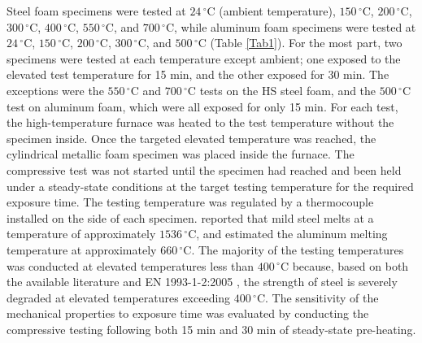 \documentclass[review]{elsarticle}
\begin{document}
Steel foam specimens were tested at $24\,^{\circ}\mathrm{C}$ (ambient temperature), $150\,^{\circ}\mathrm{C}$, $200\,^{\circ}\mathrm{C}$, $300\,^{\circ}\mathrm{C}$, $400\,^{\circ}\mathrm{C}$, $550\,^{\circ}\mathrm{C}$, and $700\,^{\circ}\mathrm{C}$, while aluminum foam specimens were tested at $24\,^{\circ}\mathrm{C}$, $150\,^{\circ}\mathrm{C}$, $200\,^{\circ}\mathrm{C}$, $300\,^{\circ}\mathrm{C}$, and $500\,^{\circ}\mathrm{C}$ (Table \ref{Tab1}). For the most part, two specimens were tested at each temperature except ambient; one exposed to the elevated test temperature for 15 min, and the other exposed for 30 min. The exceptions were the $550\,^{\circ}\mathrm{C}$ and $700\,^{\circ}\mathrm{C}$ tests on the HS steel foam, and the $500\,^{\circ}\mathrm{C}$ test on aluminum foam, which were all exposed for only 15 min. For each test, the high-temperature furnace was heated to the test temperature without the specimen inside. Once the targeted elevated temperature was reached, the cylindrical metallic foam specimen was placed inside the furnace. The compressive test was not started until the specimen had reached and been held under a steady-state conditions at the target testing temperature for the required exposure time. The testing temperature was regulated by a thermocouple installed on the side of each specimen. \cite{Avalloneetal2007} reported that mild steel melts at a temperature of approximately $1536\,^{\circ}\mathrm{C}$, and \cite{Ashsby2000} estimated the aluminum melting temperature at approximately $660\,^{\circ}\mathrm{C}$. The majority of the testing temperatures was conducted at elevated temperatures less than $400\,^{\circ}\mathrm{C}$  because, based on both the available literature and EN 1993-1-2:2005 \cite{EC3-1-2}, the strength of steel is severely degraded at elevated temperatures exceeding $400\,^{\circ}\mathrm{C}$. The sensitivity of the mechanical properties to exposure time was evaluated by conducting the compressive testing following both 15 min and 30 min of steady-state pre-heating.
\end{document}
